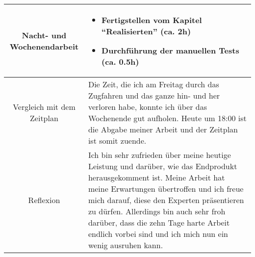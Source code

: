 \begin{tabularx}{\textwidth}[H]{|c|X|}
    Nacht- und Wochenendarbeit &
    \begin{itemize}
        \item Fertigstellen vom Kapitel \enquote{Realisierten} (ca. 2h)
        \item Durchführung der manuellen Tests (ca. 0.5h)
    \end{itemize}
    \\ \hline

    Vergleich mit dem Zeitplan &
    Die Zeit, die ich am Freitag durch das Zugfahren und das ganze hin- und her verloren habe, konnte ich über das Wochenende gut aufholen.
    Heute um 18:00 ist die Abgabe meiner Arbeit und der Zeitplan ist somit zuende.
    \\ \hline

    Reflexion &
    Ich bin sehr zufrieden über meine heutige Leistung und darüber, wie das Endprodukt herausgekomment ist.
    Meine Arbeit hat meine Erwartungen übertroffen und ich freue mich darauf, diese den Experten präsentieren zu dürfen.
    Allerdings bin auch sehr froh darüber, dass die zehn Tage harte Arbeit endlich vorbei sind und ich mich nun ein wenig ausruhen kann.
    \\ \hline
\end{tabularx}
